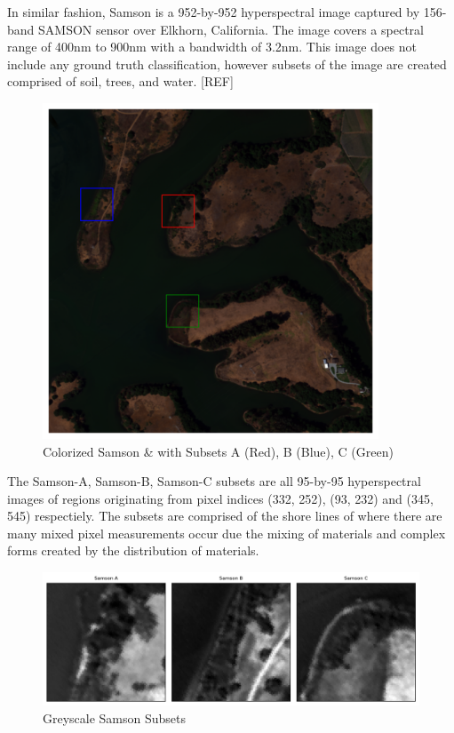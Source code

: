 In similar fashion, Samson is a 952-by-952 hyperspectral image captured by 156-band SAMSON sensor over Elkhorn, California. The image covers a spectral range of 400nm to 900nm with a bandwidth of 3.2nm. This image does not include any ground truth classification, however subsets of the image are created comprised of soil, trees, and water. [REF]
\begin{figure}[H]
  \centering
  \includegraphics[width=10cm]{samson_full.png}  %
  \caption{Colorized Samson \& with Subsets A (Red), B (Blue), C (Green)}
  \label{samson}  %
\end{figure}

The Samson-A, Samson-B, Samson-C subsets are all 95-by-95 hyperspectral images of regions originating from pixel indices (332, 252), (93, 232) and (345, 545) respectiely. The subsets are comprised of the shore lines of where there are many mixed pixel measurements occur due the mixing of materials and complex forms created by the distribution of materials.
\begin{figure}[H]
  \centering
  \includegraphics[width=15cm]{samsonabc.png}  %
  \caption{Greyscale Samson Subsets}
  \label{samsonabc}  %
\end{figure}


